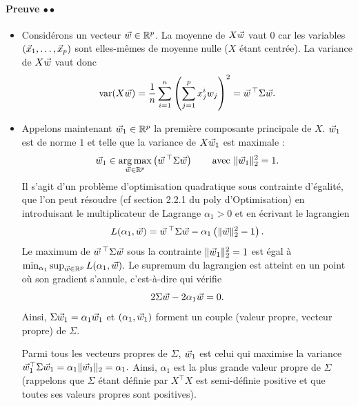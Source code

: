 \paragraph{Preuve  $\bullet\bullet$}
\begin{itemize}
\item Considérons un vecteur $\ww \in \RR^p$. 
La moyenne de $X \ww$ vaut $0$ car les variables $(\xx_1, \dots, \xx_p)$ sont
elles-mêmes de moyenne nulle ($X$ étant centrée).
La variance de $X \ww$ vaut donc 
\begin{equation*}
  \text{var}(X \ww) = \frac1n \sum_{i=1}^n \left( \sum_{j=1}^p x_j^i w_j \right)^2 = \ww^\top \Sigma \ww.
\end{equation*}    
\item Appelons maintenant $\ww_1 \in \RR^p$ la première composante principale de $X$.
$\ww_1$ est de norme $1$ et telle que la variance de $X \ww_1$ est maximale :
\begin{equation}
  \label{eq:pc1}
  \ww_1 \in \argmax_{\ww \in \RR^p} \left( \ww^\top \Sigma \ww \right)  \text{\qquad avec } \ltwonorm{\ww_1}^2=1.
\end{equation}
Il s'agit d'un problème d'optimisation quadratique sous contrainte d'égalité,
que l'on peut résoudre (cf section 2.2.1 du poly d'Optimisation) en
introduisant le multiplicateur de Lagrange $\alpha_1 > 0$ et en écrivant le
lagrangien
\begin{equation*}
  L(\alpha_1, \ww) = \ww^\top \Sigma \ww - \alpha_1 
  \left( \ltwonorm{\ww}^2 - 1 \right).
\end{equation*}
Le maximum de $\ww^\top \Sigma \ww$ sous la contrainte $\ltwonorm{\ww_1}^2=1$ est
égal à $\min_{\alpha_1} \sup_{\ww \in \RR^p} L(\alpha_1, \ww).$ Le supremum du
lagrangien est atteint en un point où son gradient s'annule, c'est-à-dire qui
vérifie
\begin{equation*}
  2 \Sigma \ww - 2 \alpha_1 \ww = 0.
\end{equation*}
Ainsi, $\Sigma \ww_1 = \alpha_1 \ww_1$ et $(\alpha_1, \ww_1)$ forment un couple
(valeur propre, vecteur propre) de $\Sigma$.

Parmi tous les vecteurs propres de $\Sigma$, $\ww_1$ est celui qui maximise la
variance $\ww_1^\top \Sigma \ww_1 = \alpha_1 \ltwonorm{\ww_1} = \alpha_1.$
Ainsi, $\alpha_1$ est la plus grande valeur propre de $\Sigma$ (rappelons que
$\Sigma$ étant définie par $X^\top X$ est semi-définie positive et que toutes
ses valeurs propres sont positives).


\end{itemize}
